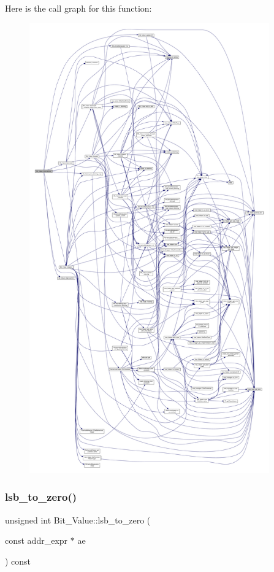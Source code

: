 Here is the call graph for this function\+:
\nopagebreak
\begin{figure}[H]
\begin{center}
\leavevmode
\includegraphics[height=550pt]{df/d4b/classBit__Value_afa7bcd5d1e9e4683bd7301de7a90e9b3_cgraph}
\end{center}
\end{figure}
\mbox{\label{classBit__Value_a71f649375c0d473c2f5b91ecc6c89365}} 
\subsubsection{\texorpdfstring{lsb\+\_\+to\+\_\+zero()}{lsb\_to\_zero()}}
{\footnotesize\ttfamily unsigned int Bit\+\_\+\+Value\+::lsb\+\_\+to\+\_\+zero (\begin{DoxyParamCaption}\item[{const addr\+\_\+expr $\ast$}]{ae }\end{DoxyParamCaption}) const\hspace{0.3cm}{\ttfamily [private]}}




